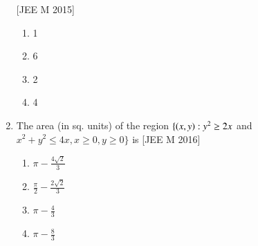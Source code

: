 \documentclass[journal,12pt,twocolumn]{IEEEtran}
\theoremstyle{remark}
\begin{document}
\begin{enumerate}[label=\textcolor{black}{\arabic*.}]
		\hfill{[JEE M 2015]}

		\begin{multicols}{4}
			\begin{enumerate}[label=(\alph*)]
				\item 1
				\item 6
				\item 2
				\item 4
			\end{enumerate}
		\end{multicols}


	\item The area (in sq. units) of the region $\{\left(x,y\right):y^2\geq2x$ and $x^2+y^2\leq4x, x\geq0, y\geq0\}$ is
		\hfill{[JEE M 2016]}

		\begin{multicols}{2}
			\begin{enumerate}[label=(\alph*)]
				\item $\pi-\frac{4\sqrt{2}}{3}$
				\item $\frac{\pi}{2}-\frac{2\sqrt{2}}{3}$
				\item $\pi-\frac{4}{3}$
				\item $\pi-\frac{8}{3}$ 
			\end{enumerate}
		\end{multicols} 
\end{enumerate}
\end{document}
